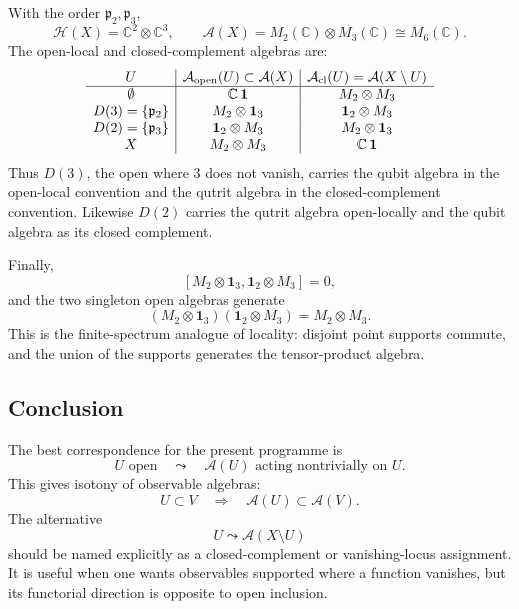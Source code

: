 With the order \(\mathfrak p_2,\mathfrak p_3\),
\[
  \mathcal H(X)=\mathbb C^2\otimes\mathbb C^3,\qquad
  \mathcal A(X)=M_2(\mathbb C)\otimes M_3(\mathbb C)\cong M_6(\mathbb C).
\]
The open-local and closed-complement algebras are:
\[
\begin{array}{c|c|c}
U & \mathcal A_{\rm open}(U)\subset\mathcal A(X)
  & \mathcal A_{\rm cl}(U)=\mathcal A(X\setminus U)\\
\hline
\emptyset & \mathbb C\,\mathbf 1 & M_2\otimes M_3\\
D(3)=\{\mathfrak p_2\} & M_2\otimes\mathbf 1_3
  & \mathbf 1_2\otimes M_3\\
D(2)=\{\mathfrak p_3\} & \mathbf 1_2\otimes M_3
  & M_2\otimes\mathbf 1_3\\
X & M_2\otimes M_3 & \mathbb C\,\mathbf 1
\end{array}
\]
Thus \(D(3)\), the open where \(3\) does not vanish, carries the qubit algebra
in the open-local convention and the qutrit algebra in the closed-complement
convention.  Likewise \(D(2)\) carries the qutrit algebra open-locally and the
qubit algebra as its closed complement.

Finally,
\[
  [M_2\otimes\mathbf 1_3,\mathbf 1_2\otimes M_3]=0,
\]
and the two singleton open algebras generate
\[
  (M_2\otimes\mathbf 1_3)(\mathbf 1_2\otimes M_3)
  =M_2\otimes M_3.
\]
This is the finite-spectrum analogue of locality: disjoint point supports
commute, and the union of the supports generates the tensor-product algebra.

\subsection{Conclusion}

The best correspondence for the present programme is
\[
  \boxed{U\text{ open}\quad\leadsto\quad
  \mathcal A(U)\text{ acting nontrivially on }U.}
\]
This gives isotony of observable algebras:
\[
  U\subset V\quad\Rightarrow\quad\mathcal A(U)\subset\mathcal A(V).
\]
The alternative
\[
  U\leadsto\mathcal A(X\setminus U)
\]
should be named explicitly as a closed-complement or vanishing-locus
assignment.  It is useful when one wants observables supported where a
function vanishes, but its functorial direction is opposite to open inclusion.
